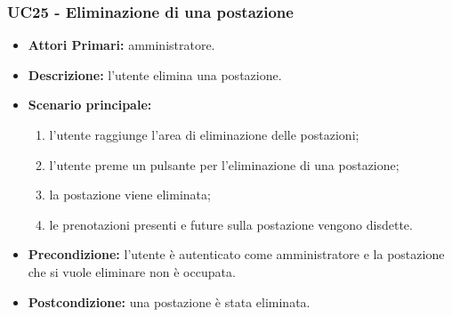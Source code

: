 \subsubsection{UC25 - Eliminazione di una postazione}
\begin{itemize}
	\item\textbf{Attori Primari:}
	amministratore.
	\item\textbf{Descrizione:}
	l'utente elimina una postazione.
	\item\textbf{Scenario principale:} 
	\begin{enumerate}
		\item l'utente raggiunge l'area di eliminazione delle postazioni;
		\item l'utente preme un pulsante per l'eliminazione di una postazione;
		\item la postazione viene eliminata;
		\item le prenotazioni presenti e future sulla postazione vengono disdette.
	\end{enumerate}
	\item\textbf{Precondizione:} 
	l'utente è autenticato come amministratore e la postazione che si vuole eliminare non è occupata.
	\item\textbf{Postcondizione:}
	una postazione è stata eliminata.
\end{itemize}

